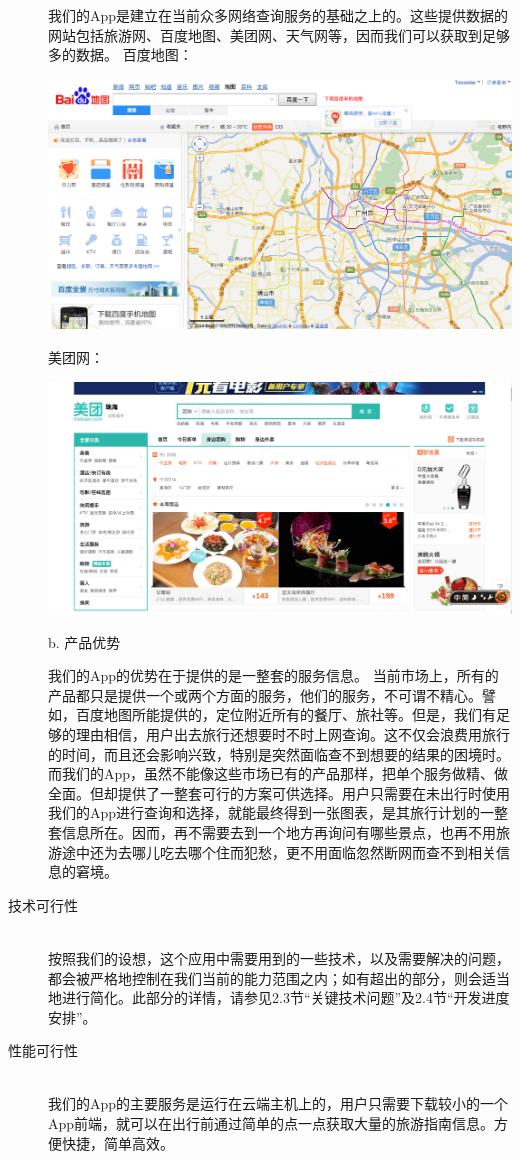 \documentclass[12pt,a4paper]{article}
\begin{document}
\begin{CJK}{UTF8}{gbsn}
\begin{description}
	我们的App是建立在当前众多网络查询服务的基础之上的。这些提供数据的网站包括旅游网、百度地图、美团网、天气网等，因而我们可以获取到足够多的数据。 
	\clearpage
	百度地图：
	\begin{center}
	\includegraphics[scale=0.3]{BaiduMap}
	\end{center}

	美团网：
	\begin{center}
	\includegraphics[scale=0.3]{Meituan}
	\end{center}

	b. 产品优势

	我们的App的优势在于提供的是一整套的服务信息。 当前市场上，所有的产品都只是提供一个或两个方面的服务，他们的服务，不可谓不精心。譬如，百度地图所能提供的，定位附近所有的餐厅、旅社等。但是，我们有足够的理由相信，用户出去旅行还想要时不时上网查询。这不仅会浪费用旅行的时间，而且还会影响兴致，特别是突然面临查不到想要的结果的困境时。而我们的App，虽然不能像这些市场已有的产品那样，把单个服务做精、做全面。但却提供了一整套可行的方案可供选择。用户只需要在未出行时使用我们的App进行查询和选择，就能最终得到一张图表，是其旅行计划的一整套信息所在。因而，再不需要去到一个地方再询问有哪些景点，也再不用旅游途中还为去哪儿吃去哪个住而犯愁，更不用面临忽然断网而查不到相关信息的窘境。
	\item[技术可行性] \hfill \\
	按照我们的设想，这个应用中需要用到的一些技术，以及需要解决的问题，都会被严格地控制在我们当前的能力范围之内；如有超出的部分，则会适当地进行简化。此部分的详情，请参见2.3节“关键技术问题”及2.4节“开发进度安排”。
	\item[性能可行性] \hfill \\
	我们的App的主要服务是运行在云端主机上的，用户只需要下载较小的一个App前端，就可以在出行前通过简单的点一点获取大量的旅游指南信息。方便快捷，简单高效。
	\end{description}


\end{CJK}
\end{document}
